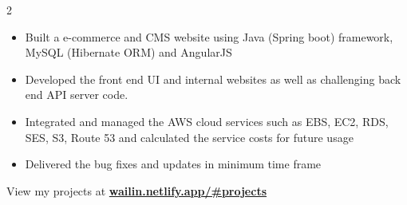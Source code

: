 \documentclass[10pt,a4paper,ragged2e,withhyper]{altacv}
\begin{document}
\begin{paracol}{2}
            \begin{itemize}
                \item Built a e-commerce and CMS website using Java (Spring boot) framework, MySQL (Hibernate ORM) and AngularJS
                \item Developed the front end UI and internal websites as well as challenging back end API server code.
                \item Integrated and managed the AWS cloud services such as EBS, EC2, RDS, SES, S3, Route 53 and calculated the service costs for future usage
                \item Delivered the bug fixes and updates in minimum time frame
            \end{itemize}

            \divider


            View my projects at \href{https://wailin.netlify.app/\#projects}{\textbf{wailin.netlify.app/\#projects}}

    \end{paracol}
\end{document}
